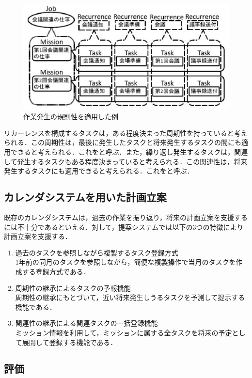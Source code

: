 \documentclass[fleqn, 14pt]{extarticlej}
\begin{document}
\begin{figure}[h]
  \begin{center}
    \includegraphics[clip,width=0.7\columnwidth]{zu4.eps}
    \caption{作業発生の規則性を適用した例}
  \end{center}
\end{figure}

	
リカーレンスを構成するタスクは，ある程度決まった周期性を持っていると考えられる．この周期性は，最後に発生したタスクと将来発生するタスクの間にも適用できると考えられる．これをと呼ぶ．また，繰り返し発生するタスクは，関連して発生するタスクもある程度決まっていると考えられる．この関連性は，将来発生するタスクにも適用できると考えられる．これをと呼ぶ．

\subsection{カレンダシステムを用いた計画立案}
既存のカレンダシステムは，過去の作業を振り返り，将来の計画立案を支援するには不十分であるといえる．対して，提案システムでは以下の3つの特徴により計画立案を支援する．
	\begin{enumerate}
		\item 過去のタスクを参照しながら複製するタスク登録方式\\
			1年前の同月のタスクを参照しながら，簡便な複製操作で当月のタスクを作成する登録方式である．
		\item 周期性の継承によるタスクの予報機能\\
			周期性の継承にもとづいて，近い将来発生しうるタスクを予測して提示する機能である．
		\item 関連性の継承による関連タスクの一括登録機能\\
			ミッション情報を利用して，ミッションに属する全タスクを将来の予定として展開して登録する機能である．
	\end{enumerate}

\subsection{評価}
\end{document}
